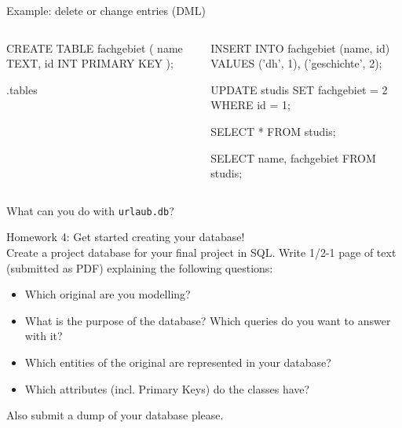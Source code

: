 \begin{frame}{Example: delete or change entries (DML) }
\begin{columns}
\begin{sqlcode}
CREATE TABLE fachgebiet (
name TEXT,
id INT PRIMARY KEY
);

.tables
\end{sqlcode}

\begin{sqlcode}
INSERT INTO fachgebiet (name, id)
VALUES ('dh', 1), ('geschichte', 2);

UPDATE studis 
SET fachgebiet = 2
WHERE id = 1;

SELECT * FROM studis;

SELECT name, fachgebiet 
FROM studis;
\end{sqlcode}
\end{columns}

\end{frame}



\begin{frame}[standout]
    What can you do with \alert{\texttt{urlaub.db}}?
\end{frame}

\begin{frame}[standout]
    \alert{Homework 4: } Get started creating your database! \\[0.5em]
    \small Create a project database for your final project in SQL. 
    Write 1/2-1 page of text (submitted as PDF) explaining the following questions:
    {\footnotesize 
    \begin{itemize}
        \item  Which original are you modelling?
        \item What is the purpose of the database? Which queries do you want to answer with it?
        \item Which entities of the original are represented in your database?
        \item Which attributes (incl. Primary Keys) do the classes have?
\end{itemize}
    }
    Also submit a dump of your database please.
\end{frame}

